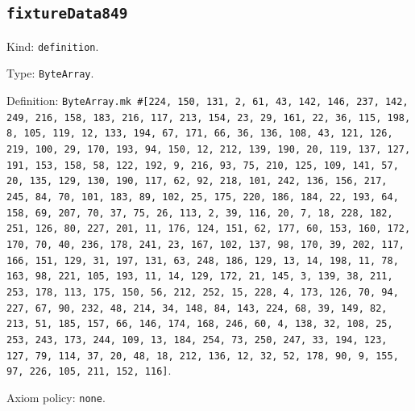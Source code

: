 \documentclass[11pt]{article}
\begin{document}
\subsection*{\texttt{fixtureData849}}
\noindent Kind: \texttt{definition}.\par
\noindent Type: \texttt{ByteArray}.\par
\noindent Definition: \texttt{ByteArray.mk \#[224, 150, 131, 2, 61, 43, 142, 146, 237, 142, 249, 216, 158, 183, 216, 117, 213, 154, 23, 29, 161, 22, 36, 115, 198, 8, 105, 119, 12, 133, 194, 67, 171, 66, 36, 136, 108, 43, 121, 126, 219, 100, 29, 170, 193, 94, 150, 12, 212, 139, 190, 20, 119, 137, 127, 191, 153, 158, 58, 122, 192, 9, 216, 93, 75, 210, 125, 109, 141, 57, 20, 135, 129, 130, 190, 117, 62, 92, 218, 101, 242, 136, 156, 217, 245, 84, 70, 101, 183, 89, 102, 25, 175, 220, 186, 184, 22, 193, 64, 158, 69, 207, 70, 37, 75, 26, 113, 2, 39, 116, 20, 7, 18, 228, 182, 251, 126, 80, 227, 201, 11, 176, 124, 151, 62, 177, 60, 153, 160, 172, 170, 70, 40, 236, 178, 241, 23, 167, 102, 137, 98, 170, 39, 202, 117, 166, 151, 129, 31, 197, 131, 63, 248, 186, 129, 13, 14, 198, 11, 78, 163, 98, 221, 105, 193, 11, 14, 129, 172, 21, 145, 3, 139, 38, 211, 253, 178, 113, 175, 150, 56, 212, 252, 15, 228, 4, 173, 126, 70, 94, 227, 67, 90, 232, 48, 214, 34, 148, 84, 143, 224, 68, 39, 149, 82, 213, 51, 185, 157, 66, 146, 174, 168, 246, 60, 4, 138, 32, 108, 25, 253, 243, 173, 244, 109, 13, 184, 254, 73, 250, 247, 33, 194, 123, 127, 79, 114, 37, 20, 48, 18, 212, 136, 12, 32, 52, 178, 90, 9, 155, 97, 226, 105, 211, 152, 116]}.\par
\noindent Axiom policy: \texttt{none}.\par
\end{document}
